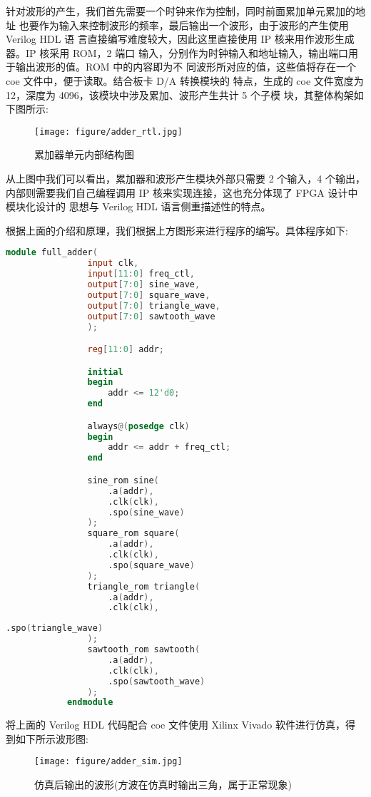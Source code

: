 {\begin{spacing}{1.5}
			针对波形的产生，我们首先需要一个时钟来作为控制，同时前面累加单元累加的地址 也要作为输入来控制波形的频率，最后输出一个波形，由于波形的产生使用 Verilog HDL 语 言直接编写难度较大，因此这里直接使用 IP 核来用作波形生成器。IP 核采用 ROM，2 端口 输入，分别作为时钟输入和地址输入，输出端口用于输出波形的值。ROM 中的内容即为不 同波形所对应的值，这些值将存在一个 coe 文件中，便于读取。结合板卡 D/A 转换模块的 特点，生成的 coe 文件宽度为 12，深度为 4096，该模块中涉及累加、波形产生共计 5 个子模 块，其整体构架如下图所示:
			\newline
			\begin{figure}[htbp]
				\centering
				\texttt{[image: figure/adder\_rtl.jpg]}
				\caption{累加器单元内部结构图}\label{fig:adder_rtl}
			\end{figure}

			从上图中我们可以看出，累加器和波形产生模块外部只需要 2 个输入，4 个输出，内部则需要我们自己编程调用 IP 核来实现连接，这也充分体现了 FPGA 设计中模块化设计的 思想与 Verilog HDL 语言侧重描述性的特点。

			根据上面的介绍和原理，我们根据上方图形来进行程序的编写。具体程序如下:
			\newpage
			\begin{lstlisting}[language=Verilog]
			module full_adder(
				input clk,
				input[11:0] freq_ctl,
				output[7:0] sine_wave,
				output[7:0] square_wave,
				output[7:0] triangle_wave,
				output[7:0] sawtooth_wave
				);

				reg[11:0] addr;

				initial
				begin
					addr <= 12'd0;
				end

				always@(posedge clk)
				begin
					addr <= addr + freq_ctl;
				end

				sine_rom sine(
					.a(addr),
					.clk(clk),
					.spo(sine_wave)
				);
				square_rom square(
					.a(addr),
					.clk(clk),
					.spo(square_wave)
				);
				triangle_rom triangle(
					.a(addr),
					.clk(clk),
			\end{lstlisting}
			\begin{lstlisting}[language=Verilog]
					.spo(triangle_wave)
				);
				sawtooth_rom sawtooth(
					.a(addr),
					.clk(clk),
					.spo(sawtooth_wave)
				);
			endmodule
			\end{lstlisting}

			将上面的 Verilog HDL 代码配合 coe 文件使用 Xilinx Vivado 软件进行仿真，得到如下所示波形图:
			\newline
			\begin{figure}[htbp]
				\centering
				\texttt{[image: figure/adder\_sim.jpg]}
				\caption{仿真后输出的波形(方波在仿真时输出三角，属于正常现象)}\label{fig:adder_sim}
			\end{figure}


\end{spacing}}
